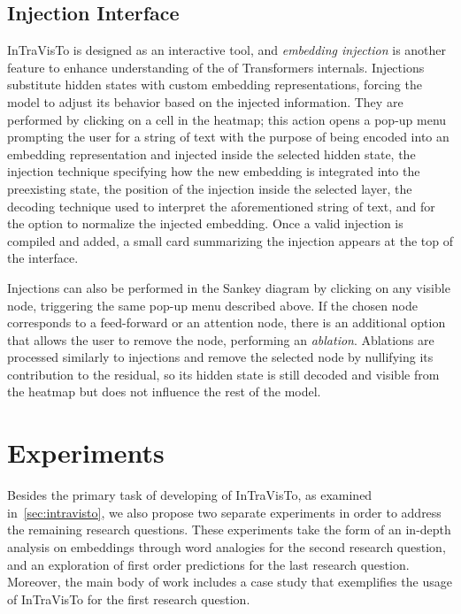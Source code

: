 \documentclass[11pt,a4paper,twocolumn]{article}
\begin{document}
\subsection{Injection Interface}

InTraVisTo is designed as an interactive tool, and \emph{embedding injection} is another feature to enhance understanding of the of Transformers internals.
Injections substitute hidden states with custom embedding representations, forcing the model to adjust its behavior based on the injected information.
They are performed by clicking on a cell in the heatmap; this action opens a pop-up menu prompting the user for a string of text with the purpose of being encoded into an embedding representation and injected inside the selected hidden state, the injection technique specifying how the new embedding is integrated into the preexisting state, the position of the injection inside the selected layer, the decoding technique used to interpret the aforementioned string of text, and for the option to normalize the injected embedding.
Once a valid injection is compiled and added, a small card summarizing the injection appears at the top of the interface.

Injections can also be performed in the Sankey diagram by clicking on any visible node, triggering the same pop-up menu described above.
If the chosen node corresponds to a feed-forward or an attention node, there is an additional option that allows the user to remove the node, performing an \emph{ablation}.
Ablations are processed similarly to injections and remove the selected node by nullifying its contribution to the residual, so its hidden state is still decoded and visible from the heatmap but does not influence the rest of the model.

\section{Experiments}\label{sec:experiments}

Besides the primary task of developing of InTraVisTo, as examined in~\cref{sec:intravisto}, we also propose two separate experiments in order to address the remaining research questions.
These experiments take the form of an in-depth analysis on embeddings through word analogies for the second research question, and an exploration of first order predictions for the last research question.
Moreover, the main body of work includes a case study that exemplifies the usage of InTraVisTo for the first research question.
\end{document}
